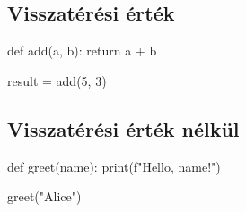 \subsection{Visszatérési érték}
\begin{pycode}
    def add(a, b):
        return a + b

    result = add(5, 3)
\end{pycode}

\subsection{Visszatérési érték nélkül}
\begin{pycode}
    def greet(name):
        print(f"Hello, {name}!")

    greet("Alice")
\end{pycode}